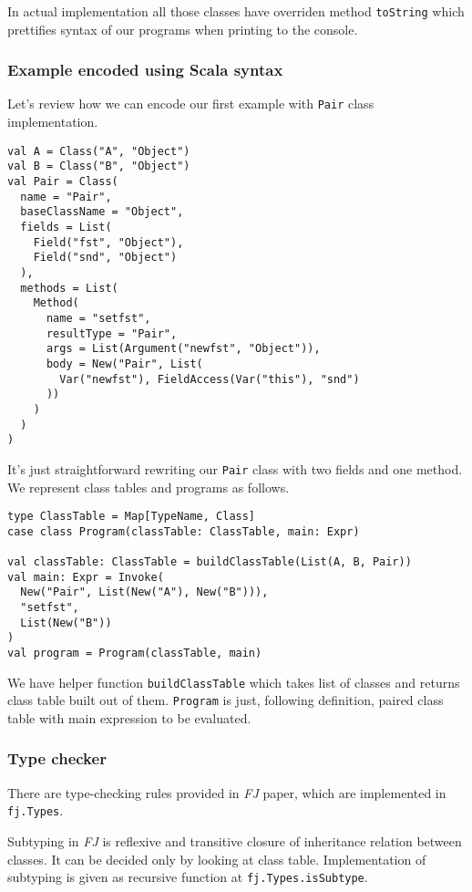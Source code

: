 \documentclass{article}[12pt]
\begin{document}
In actual implementation all those classes have overriden method \texttt{toString} which prettifies syntax of our programs when printing to the console.

\subsubsection{Example encoded using Scala syntax}

Let's review how we can encode our first example with \texttt{Pair} class implementation.

\begin{verbatim}
val A = Class("A", "Object")
val B = Class("B", "Object")
val Pair = Class(
  name = "Pair",
  baseClassName = "Object",
  fields = List(
    Field("fst", "Object"),
    Field("snd", "Object")
  ),
  methods = List(
    Method(
      name = "setfst",
      resultType = "Pair",
      args = List(Argument("newfst", "Object")),
      body = New("Pair", List(
        Var("newfst"), FieldAccess(Var("this"), "snd")
      ))
    )
  )
)
\end{verbatim}
It's just straightforward rewriting our \texttt{Pair} class with two fields and one method. We represent class tables and programs as follows.

\begin{verbatim}
type ClassTable = Map[TypeName, Class]
case class Program(classTable: ClassTable, main: Expr)

val classTable: ClassTable = buildClassTable(List(A, B, Pair))
val main: Expr = Invoke(
  New("Pair", List(New("A"), New("B"))),
  "setfst",
  List(New("B"))
)
val program = Program(classTable, main)
\end{verbatim}

We have helper function \texttt{buildClassTable} which takes list of classes and returns class table built out of them. \texttt{Program} is just, following definition, paired class table with main expression to be evaluated.

\subsubsection{Type checker}

There are type-checking rules provided in \emph{FJ} paper, which are implemented in \texttt{fj.Types}.

Subtyping in \emph{FJ} is reflexive and transitive closure of inheritance relation between classes. It can be decided only by looking at class table. Implementation of subtyping is given as recursive function at \texttt{fj.Types.isSubtype}.
\end{document}
